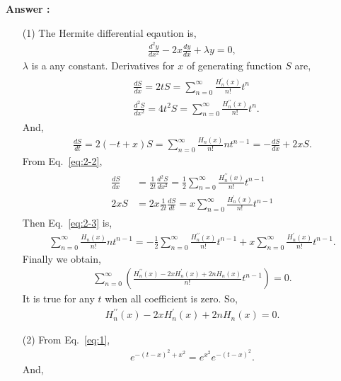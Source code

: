 \documentclass[floatfix,nofootinbib,superscriptaddress,fleqn]{revtex4-2}
\begin{document}
\noindent \textbf{Answer : }
\begin{itemize}
\item[(1)] The Hermite differential eqaution is,
\begin{align}\label{eq:2-1}
  \frac{d^2y}{dx^2}-2x\frac{dy}{dx}+\lambda y = 0,
\end{align}
$\lambda$ is a any constant. Derivatives for $x$ of generating function $S$ are,
\begin{align}\label{eq:2-2}
  \begin{split}
    &\frac{dS}{dx} = 2tS = \sum^\infty_{n=0}\frac{H^\prime_n(x)}{n!}t^n  \\
    &\frac{d^2S}{dx^2} = 4t^2S=\sum^\infty_{n=0}\frac{H^{\prime\prime}_n(x)}{n!}t^n.
  \end{split}
\end{align}
And,
\begin{align}\label{eq:2-3}
  \frac{dS}{dt} = 2(-t+x)S = \sum^\infty_{n=0}\frac{H_n(x)}{n!}nt^{n-1}
  =-\frac{dS}{dx} +2xS.
\end{align}
From Eq.~\eqref{eq:2-2},
\begin{align*}
  \begin{split}
    \frac{dS}{dx} &= \frac{1}{2t}\frac{d^2S}{dx^2}
    =\frac{1}{2}\sum^\infty_{n=0}\frac{H^{\prime\prime}_n(x)}{n!}t^{n-1}  \\
    2xS &= 2x\frac{1}{2t}\frac{dS}{dt} 
    =x\sum^\infty_{n=0}\frac{H^{\prime}_n(x)}{n!}t^{n-1}
  \end{split}
\end{align*}
Then Eq.~\eqref{eq:2-3} is,
\begin{align*}
  \sum^\infty_{n=0}\frac{H_n(x)}{n!}nt^{n-1}
  =-\frac{1}{2}\sum^\infty_{n=0}\frac{H^{\prime\prime}_n(x)}{n!}t^{n-1}
  +x\sum^\infty_{n=0}\frac{H^{\prime}_n(x)}{n!}t^{n-1}.
\end{align*}
Finally we obtain,
\begin{align*}
  \sum^\infty_{n=0}\left(\frac{H^{\prime\prime}_n(x)
  -2xH^{\prime}_n(x)+2nH_n(x)}{n!}t^{n-1}\right)=0.
\end{align*}
It is true for any $t$ when all coefficient is zero. So,
\begin{align}\label{eq:2-4}
  H^{\prime\prime}_n(x)
  -2xH^{\prime}_n(x)+2nH_n(x)=0.
\end{align}
\item[(2)] From Eq.~\eqref{eq:1}, 
\begin{align*}
  e^{-(t-x)^2+x^2}=e^{x^2}e^{-(t-x)^2}.
\end{align*}
And, 
\begin{align*}

\end{align*}
\end{itemize}
\end{document}
